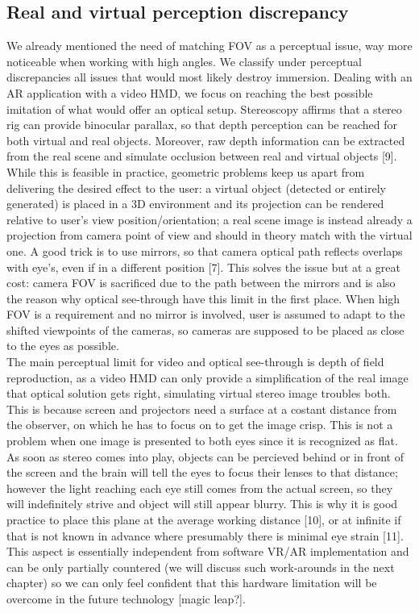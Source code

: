 \subsection{Real and virtual perception discrepancy}
We already mentioned the need of matching FOV as a perceptual issue, way more noticeable when working with high angles. We classify under perceptual discrepancies all issues that would most likely destroy immersion. Dealing with an AR application with a video HMD, we focus on reaching the best possible imitation of what would offer an optical setup. Stereoscopy affirms that a stereo rig can provide binocular parallax, so that depth perception can be reached for both virtual and real objects. Moreover, raw depth information can be extracted from the real scene and simulate occlusion between real and virtual objects [9].\\
While this is feasible in practice, geometric problems keep us apart from delivering the desired effect to the user: a virtual object (detected or entirely generated) is placed in a 3D environment and its projection can be rendered relative to user's view position/orientation; a real scene image is instead already a projection from camera point of view and should in theory match with the virtual one. A good trick is to use mirrors, so that camera optical path reflects overlaps with eye's, even if in a different position [7]. This solves the issue but at a great cost: camera FOV is sacrificed due to the path between the mirrors and is also the reason why optical see-through have this limit in the first place. When high FOV is a requirement and no mirror is involved, user is assumed to adapt to the shifted viewpoints of the cameras, so cameras are supposed to be placed as close to the eyes as possible.\\
The main perceptual limit for video and optical see-through is depth of field reproduction, as a video HMD can only provide a simplification of the real image that optical solution gets right, simulating virtual stereo image troubles both. This is because screen and projectors need a surface at a costant distance from the observer, on which he has to focus on to get the image crisp. This is not a problem when one image is presented to both eyes since it is recognized as flat. As soon as stereo comes into play, objects can be percieved behind or in front of the screen and the brain will tell the eyes to focus their lenses to that distance; however the light reaching each eye still comes from the actual screen, so they will indefinitely strive and object will still appear blurry. This is why it is good practice to place this plane at the average working distance [10], or at infinite if that is not known in advance where presumably there is minimal eye strain [11]. This aspect is essentially independent from software VR/AR implementation and can be only partially countered (we will discuss such work-arounds in the next chapter) so we can only feel confident that this hardware limitation will be overcome in the future technology [magic leap?].\\
